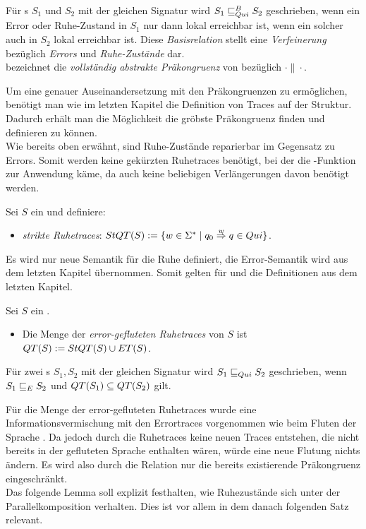 \begin{Def}
  Für \EIO{}s $S_1$ und $S_2$ mit der gleichen Signatur wird
  $S_1\sqsubseteq _{Qui}^B S_2$ geschrieben, wenn ein Error oder Ruhe-Zustand in $S_1$ nur
  dann lokal erreichbar ist, wenn ein solcher auch in $S_2$ lokal erreichbar
  ist. Diese \emph{Basisrelation} stellt eine \emph{Verfeinerung} bezüglich
  \emph{Errors} und \emph{Ruhe-Zustände} dar.\\
  \QCRel{} bezeichnet die \emph{vollständig abstrakte Präkongruenz} von
  \QBRel{} bezüglich $\cdot\|\cdot$.
\end{Def}

Um eine genauer Auseinandersetzung mit den Präkongruenzen zu ermöglichen,
benötigt man wie im letzten Kapitel die Definition von Traces auf der Struktur.
Dadurch erhält man die Möglichkeit die gröbste Präkongruenz finden und
definieren zu können.\\
Wie bereits oben erwähnt, sind Ruhe-Zustände reparierbar im Gegensatz zu
Errors. Somit werden keine gekürzten Ruhetraces benötigt, bei der die
\prune{}-Funktion zur Anwendung käme, da auch keine beliebigen Verlängerungen
davon benötigt werden.

\begin{Def}[Ruhetraces]
  \label{DefRuhetraces}
  Sei $S$ ein \EIO{} und definiere:
  \begin{itemize}
    \item \emph{strikte Ruhetraces}: $StQT{}(S) := \{w\in\Sigma ^*\mid q_0
      \overset{w}{\Rightarrow} q\in Qui\}$.
  \end{itemize}
\end{Def}

Es wird nur neue Semantik für die Ruhe definiert, die Error-Semantik wird aus
dem letzten Kapitel übernommen. Somit gelten für \ET{} und \EL{} die
Definitionen aus dem letzten Kapitel.

\begin{Def}
  \label{DefQTQL}
  Sei $S$ ein \EIO{}.
  \begin{itemize}
    \item Die Menge der \emph{error-gefluteten Ruhetraces} von $S$ ist
      $QT{}(S) := StQT{}(S)\cup ET{}(S)$.
  \end{itemize}
  Für zwei \EIO{}s $S_1, S_2$ mit der gleichen Signatur wird
  $S_1\sqsubseteq _{Qui} S_2$ geschrieben, wenn $S_1\sqsubseteq _E S_2$ und $QT{}(S_1)\subseteq
  QT{}(S_2)$ gilt.
\end{Def}

Für die Menge der error-gefluteten Ruhetraces \QT{} wurde eine Informationsvermischung
mit den Errortraces vorgenommen wie beim Fluten der Sprache \EL{}. Da jedoch
durch die Ruhetraces keine neuen Traces entstehen, die nicht bereits in der
gefluteten Sprache \EL{} enthalten wären, würde eine neue Flutung nichts
ändern. Es wird also durch die Relation \QRel{} nur die
bereits existierende Präkongruenz \ERel{} eingeschränkt.\\
Das folgende Lemma soll explizit festhalten, wie Ruhezustände sich unter der
Parallelkomposition verhalten. Dies ist vor allem in dem danach folgenden Satz
relevant.

